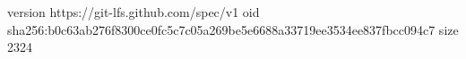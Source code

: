 version https://git-lfs.github.com/spec/v1
oid sha256:b0c63ab276f8300ce0fc5c7c05a269be5e6688a33719ee3534ee837fbcc094c7
size 2324
